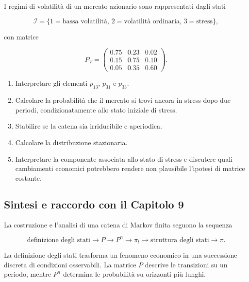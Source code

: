 \begin{exercise}
I regimi di volatilit\`{a} di un mercato azionario sono rappresentati
dagli stati

\[
\mathcal{I}
=
\{
1=\text{bassa volatilit\`{a}},
\,
2=\text{volatilit\`{a} ordinaria},
\,
3=\text{stress}
\},
\]

con matrice

\[
P_V
=
\begin{pmatrix}
0.75&0.23&0.02\\
0.15&0.75&0.10\\
0.05&0.35&0.60
\end{pmatrix}.
\]

\begin{enumerate}

\item Interpretare gli elementi \(p_{13}\), \(p_{31}\) e \(p_{33}\).

\item Calcolare la probabilit\`{a} che il mercato si trovi ancora in
stress dopo due periodi, condizionatamente allo stato iniziale di stress.

\item Stabilire se la catena sia irriducibile e aperiodica.

\item Calcolare la distribuzione stazionaria.

\item Interpretare la componente associata allo stato di stress e
discutere quali cambiamenti economici potrebbero rendere non plausibile
l'ipotesi di matrice costante.
\end{enumerate}
\end{exercise}

\subsection{Sintesi e raccordo con il Capitolo 9}

La costruzione e l'analisi di una catena di Markov finita seguono la
sequenza

\[
\text{definizione degli stati}
\longrightarrow
P
\longrightarrow
P^n
\longrightarrow
\pi_t
\longrightarrow
\text{struttura degli stati}
\longrightarrow
\pi.
\]

La definizione degli stati trasforma un fenomeno economico in una
successione discreta di condizioni osservabili. La matrice \(P\)
descrive le transizioni su un periodo, mentre \(P^n\) determina le
probabilit\`{a} su orizzonti pi\`{u} lunghi.

